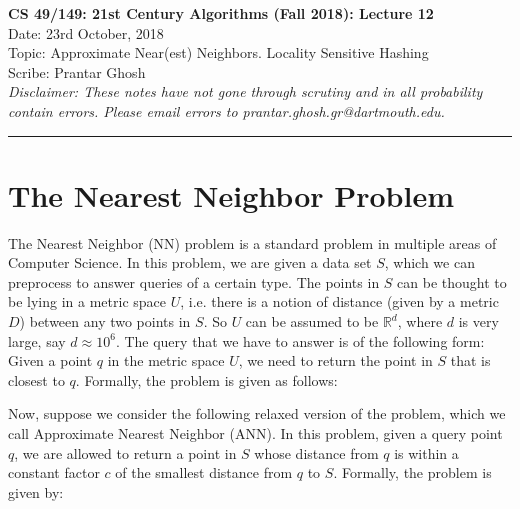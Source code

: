 \documentclass[11pt]{article}
\begin{document}
	\begin{center}
		{\bf \Large CS 49/149: 21st Century Algorithms (Fall 2018): Lecture 12}\\ 
		Date: 23rd October, 2018 \\
		Topic: Approximate Near(est) Neighbors. Locality Sensitive Hashing \\
		Scribe: Prantar Ghosh \\
		{\em Disclaimer: These notes have not gone through scrutiny and in all probability contain errors. Please email errors to prantar.ghosh.gr@dartmouth.edu.}
	\end{center}
\hrule height 2pt
\vspace{3ex}
\def\loss{\mathsf{loss}}
\section{The Nearest Neighbor Problem}

The {\sc Nearest Neighbor (NN)} problem is a standard problem in multiple areas of Computer Science. In this problem, we are given a data set $S$, which we can preprocess to answer queries of a certain type. The points in $S$ can be thought to be lying in a metric space $U$, i.e. there is a notion of distance (given by a metric $D$) between any two points in $S$. So $U$ can be assumed to be $\mathbb{R}^d$, where $d$ is very large, say $d \approx 10^6$. The query that we have to answer is of the following form: Given a point $q$ in the metric space $U$, we need to return the point in $S$ that is closest to $q$. Formally, the problem is given as follows:

\noindent
{}
\medskip

Now, suppose we consider the following relaxed version of the problem, which we call {\sc Approximate Nearest Neighbor (ANN)}. In this problem, given a query point $q$, we are allowed to return a point in $S$ whose distance from $q$ is within a constant factor $c$ of the smallest distance from $q$ to $S$. Formally, the problem is given by:\medskip 

\noindent
{}
\medskip
\end{document}
